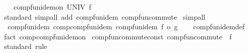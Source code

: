 \begin{isabellebody}
\ \ \isamarkupfalse%
\ {\isachardoublequoteopen}comp{\isacharunderscore}{\kern0pt}fun{\isacharunderscore}{\kern0pt}idem{\isacharunderscore}{\kern0pt}on\ UNIV\ f{\isachardoublequoteclose}\isanewline
\ \ \ \ \isamarkupfalse%
\ standard\ {\isacharparenleft}{\kern0pt}simp{\isacharunderscore}{\kern0pt}all\ add{\isacharcolon}{\kern0pt}\ comp{\isacharunderscore}{\kern0pt}fun{\isacharunderscore}{\kern0pt}idem\ comp{\isacharunderscore}{\kern0pt}fun{\isacharunderscore}{\kern0pt}commute{\isacharparenright}{\kern0pt}\isanewline
{}\isamarkupfalse%
\ simp{\isacharunderscore}{\kern0pt}all%
\endisatagproof
{\isafoldproof}%
%
\isadelimproof
\isanewline
%
\endisadelimproof
\isanewline
{}\isamarkupfalse%
\isanewline
\isanewline
{}\isamarkupfalse%
\ {\isacharparenleft}{\kern0pt}\ comp{\isacharunderscore}{\kern0pt}fun{\isacharunderscore}{\kern0pt}idem{\isacharparenright}{\kern0pt}\ comp{\isacharunderscore}{\kern0pt}comp{\isacharunderscore}{\kern0pt}fun{\isacharunderscore}{\kern0pt}idem{\isacharcolon}{\kern0pt}\ {\isachardoublequoteopen}comp{\isacharunderscore}{\kern0pt}fun{\isacharunderscore}{\kern0pt}idem\ {\isacharparenleft}{\kern0pt}f\ o\ g{\isacharparenright}{\kern0pt}{\isachardoublequoteclose}\isanewline
%
\isadelimproof
\ \ %
\endisadelimproof
%
\isatagproof
{}\isamarkupfalse%
\ comp{\isacharunderscore}{\kern0pt}fun{\isacharunderscore}{\kern0pt}idem{\isacharunderscore}{\kern0pt}def{\isacharprime}{\kern0pt}\ \isamarkupfalse%
\ {\isacharparenleft}{\kern0pt}fact\ comp{\isacharunderscore}{\kern0pt}comp{\isacharunderscore}{\kern0pt}fun{\isacharunderscore}{\kern0pt}idem{\isacharunderscore}{\kern0pt}on{\isacharparenright}{\kern0pt}%
\endisatagproof
{\isafoldproof}%
%
\isadelimproof
%
\endisadelimproof
%
\isadelimdocument
%
\endisadelimdocument
%
\isatagdocument
%
\isamarkuptrue%
%
\endisatagdocument
{\isafolddocument}%
%
\isadelimdocument
%
\endisadelimdocument
{}\isamarkupfalse%
\ comp{\isacharunderscore}{\kern0pt}fun{\isacharunderscore}{\kern0pt}commute{\isacharunderscore}{\kern0pt}const{\isacharcolon}{\kern0pt}\ {\isachardoublequoteopen}comp{\isacharunderscore}{\kern0pt}fun{\isacharunderscore}{\kern0pt}commute\ {\isacharparenleft}{\kern0pt}{\isasymlambda}{\isacharunderscore}{\kern0pt}{\isachardot}{\kern0pt}\ f{\isacharparenright}{\kern0pt}{\isachardoublequoteclose}\isanewline
%
\isadelimproof
\ \ %
\endisadelimproof
%
\isatagproof
{}\isamarkupfalse%
\ standard\ rule%

\end{isabellebody}
